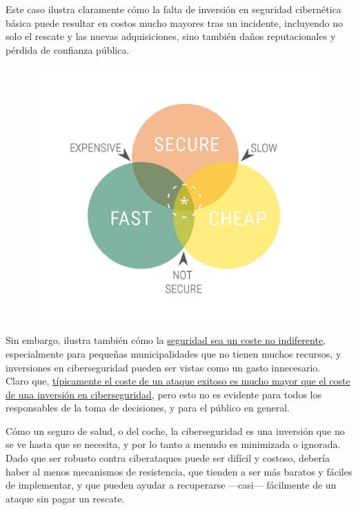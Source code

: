 Este caso ilustra claramente cómo la falta de inversión en seguridad cibernética básica puede resultar en costos mucho mayores tras un incidente, incluyendo no solo el rescate y las nuevas adquisiciones, sino también daños reputacionales y pérdida de confianza pública.

\begin{paracol}{2}
    

    \colfill
    \begin{figure}[htbp]
        \centering
        \includegraphics[width=0.85\columnwidth]{images/FSC.jpg}
        \label{fig:FSC}
    \end{figure}
    \colfill
    
    \switchcolumn
    Sin embargo, ilustra también cómo la \ul{seguridad sea un coste no indiferente}, especialmente para pequeñas municipalidades que no tienen muchos recursos, y inversiones en ciberseguridad pueden ser vistas como un gasto innecesario.\\
    Claro que, \ul{típicamente el coste de un ataque exitoso es mucho mayor que el coste de una inversión en ciberseguridad}, pero esto no es evidente para todos los responsables de la toma de decisiones, y para el público en general.
    
    Cómo un seguro de salud, o del coche, la ciberseguridad es una inversión que no se ve hasta que se necesita, y por lo tanto a menudo es minimizada o ignorada.\\
    Dado que ser robusto contra ciberataques puede ser difícil y costoso, debería haber al menos mecanismos de resistencia, que tienden a ser más baratos y fáciles de implementar, y que pueden ayudar a recuperarse ---casi--- fácilmente de un ataque sin pagar un rescate.
    
\end{paracol}


